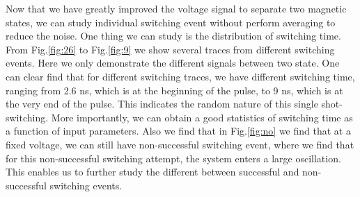 Now that we have greatly improved the voltage signal to separate two magnetic states, we can study individual switching event without perform averaging to reduce the noise. One thing we can study is the distribution of switching time. From Fig.\ref{fig:26} to Fig.\ref{fig:9} we show several traces from different switching events. Here we only demonstrate the different signals between two state. One can clear find that for different switching traces, we have different switching time, ranging from 2.6 ns, which is at the beginning of the pulse, to 9 ns, which is at the very end of the pulse. This indicates the random nature of this single shot-switching. More importantly, we can obtain a good statistics of switching time as a function of input parameters. Also we find that in Fig.\ref{fig:no} we find that at a fixed voltage, we can still have non-successful switching event, where we find that for this non-successful switching attempt, the system enters a large oscillation. This enables us to further study the different between successful and non-successful switching events. 




